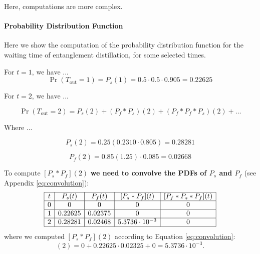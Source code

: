 \documentclass{masterthesis}
\begin{document}
Here, computations are more complex.

\paragraph*{Probability Distribution Function}

Here we show the computation of the probability distribution function for the waiting time of entanglement distillation, for some selected times.

For $t = 1$, we have ...
\begin{equation}
    \Pr(T_{\text{out}} = 1) = P_s(1) = 0.5 \cdot 0.5 \cdot 0.905 = 0.22625
\end{equation}

For $t = 2$, we have ...

\begin{equation}\label{eq:distillation_t2}
    \Pr(T_{\text{out}} = 2) = P_s(2) + (P_f \ast P_s)(2) + (P_f \ast P_f \ast P_s)(2) + \ldots
\end{equation}

Where ...

\begin{equation}
    P_s(2) = 0.25 \left(0.2310 \cdot 0.805\right) = 0.28281
\end{equation}

\begin{equation}
    P_f(2) = 0.85 \left(1.25\right) \cdot 0.085 = 0.02668
\end{equation}

To compute $[P_s \ast P_f](2)$ \textbf{we need to convolve the PDFs of $P_s$ and $P_f$} (see Appendix \ref{eq:convolution}):
\begin{equation*}
    \begin{array}{|c|c|c|c|c|}
        \hline
        t & P_s(t) & P_f(t) & [P_s \ast P_f](t) & [P_f \ast P_s \ast P_f](t) \\
        \hline
        0 & 0 & 0 & 0 & 0 \\
        \hline
        1 & 0.22625 & 0.02375 & 0 & 0 \\
        \hline
        2 & 0.28281 & 0.02468 & 5.3736 \cdot 10^{-3} & 0 \\
        \hline
    \end{array}
\end{equation*}
where we computed $[P_s \ast P_f](2)$ according to Equation \ref{eq:convolution}:
\begin{equation}
    [P_s * P_f](2) = 0 + 0.22625 \cdot 0.02325 + 0 = 5.3736 \cdot 10^{-3} .
\end{equation}
\end{document}
